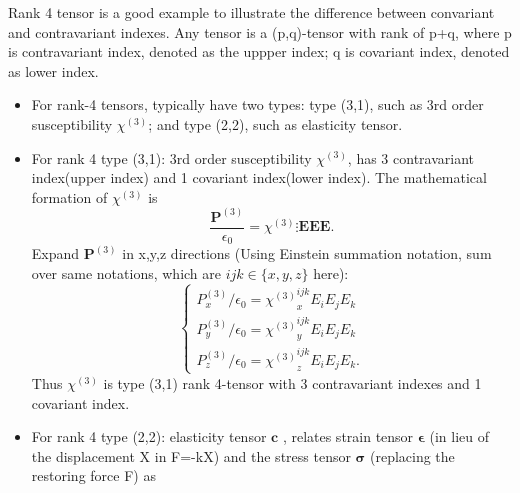 \documentclass[12pt]{extarticle}
\numberwithin{equation}{section}
\numberwithin{figure}{section}
\numberwithin{table}{section}
\newcommand{\<}{\langle}
\renewcommand{\>}{\rangle}
\theoremstyle{definition}
\newcommand{\SubItem}[1]{
    {\setlength\itemindent{15pt} \item[-] #1}
}
\begin{document}
\begin{itemize}
                \SubItem{ Rank 4 tensor is a good example to illustrate the difference between convariant and contravariant indexes. Any tensor is a (p,q)-tensor with rank of p+q, where p is contravariant index, denoted as the uppper index; q is covariant index, denoted as lower index.
                    \begin{itemize}
                        \item For rank-4 tensors, typically have two types: type (3,1), such as 3rd order susceptibility $\chi^{(3)}$; and type (2,2), such as elasticity tensor\cite{noauthor_hookes_2019}.
                        \item For rank 4 type (3,1): 3rd order susceptibility $\chi^{(3)}$, has 3 contravariant index(upper index) and 1 covariant index(lower index). The mathematical formation of $\chi^{(3)}$ is
                            \begin{equation}
                                \label{illustration of chi3 as (1,3)-tensor}
                                \frac{\boldsymbol{P}^{(3)}}{\epsilon_0} = \chi^{(3)} \vdots \boldsymbol{EEE}.
                            \end{equation}
                        Expand $\boldsymbol{P}^{(3)}$ in x,y,z directions (Using Einstein summation notation, sum over same notations, which are $ ijk \in \{x,y,z\} $ here):
                            \begin{equation}
                                \begin{cases}
                                P^{(3)}_x /\epsilon_0 = {\chi^{(3)}}_x^{ijk}E_i E_j E_k\\
                                P^{(3)}_y / \epsilon_0 = {\chi^{(3)}}_y^{ijk}E_i E_j E_k\\
                                P^{(3)}_z /\epsilon_0 = {\chi^{(3)}}_z^{ijk}E_i E_j E_k.
                                \end{cases}
                            \end{equation}
                        Thus $\chi^{(3)}$ is type (3,1) rank 4-tensor with 3 contravariant indexes and 1 covariant index.
                        \item For rank 4 type (2,2): elasticity tensor $\boldsymbol{c}$ \cite{noauthor_hookes_2019}, relates strain tensor $\boldsymbol{\epsilon}$ (in lieu of the displacement X in F=-kX) and the stress tensor $\boldsymbol{\sigma}$ (replacing the restoring force F) as
                            \begin{equation}

\end{equation}
\end{itemize}}
\end{itemize}
\end{document}
